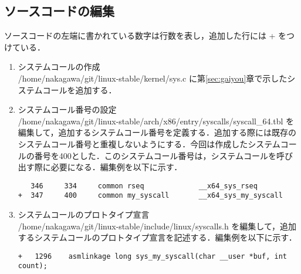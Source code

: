 \documentclass[12pt]{jsarticle}
\begin{document}
\subsection{ソースコードの編集}\label{sec:hensyuu}
ソースコードの左端に書かれている数字は行数を表し，追加した行には + をつけている．
  \begin{enumerate}
  \item システムコールの作成\\    
    /home/nakagawa/git/linux-stable/kernel/sys.c に第\ref{sec:gaiyou}章で示したシステムコールを追加する．
  \item システムコール番号の設定\\
    /home/nakagawa/git/linux-stable/arch/x86/entry/syscalls/syscall\_64.tbl を編集して，追加するシステムコール番号を定義する．追加する際には既存のシステムコール番号と重複しないようにする．今回は作成したシステムコールの番号を400とした．このシステムコール番号は，システムコールを呼び出す際に必要になる．編集例を以下に示す．
    
\begin{verbatim}
   346     334     common rseq             __x64_sys_rseq
+  347     400     common my_syscall       __x64_sys_my_syscall
\end{verbatim}

\item システムコールのプロトタイプ宣言\\  
  /home/nakagawa/git/linux-stable/include/linux/syscalls.h を編集して，追加するシステムコールのプロトタイプ宣言を記述する．編集例を以下に示す．
\begin{verbatim}
+   1296    asmlinkage long sys_my_syscall(char __user *buf, int count);
\end{verbatim}
  \end{enumerate}
  
\end{document}

